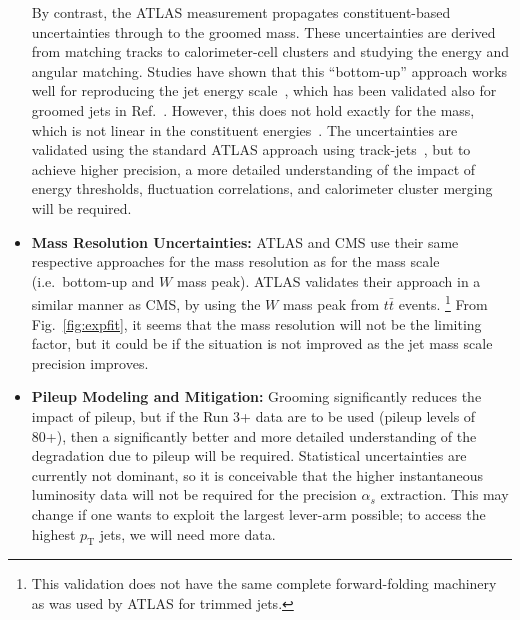 \documentclass[11pt,letterpaper]{article}
\DeclareRobustCommand{\Fig}[1]{Fig.~\ref{#1}}
\DeclareRobustCommand{\Ref}[1]{Ref.~\cite{#1}}
\begin{document}
\begin{itemize}
By contrast, the ATLAS measurement propagates constituent-based uncertainties through to the groomed mass.
%
These uncertainties are derived from matching tracks to calorimeter-cell clusters and studying the energy and angular matching.
%
Studies have shown that this ``bottom-up'' approach works well for reproducing the jet energy scale~\cite{Aaboud:2016hwh}, which has been validated also for groomed jets in \Ref{Aaboud:2017qwh}.
%
However, this does not hold exactly for the mass, which is not linear in the constituent energies~\cite{Nachman:2016qyc}.
%
The uncertainties are validated using the standard ATLAS approach using track-jets~\cite{Aad:2013gja,ATLAS-CONF-2017-063}, but to achieve higher precision, a more detailed understanding of the impact of energy thresholds, fluctuation correlations, and calorimeter cluster merging will be required.
%
\item {\bf Mass Resolution Uncertainties:} ATLAS and CMS use their same respective approaches for the mass resolution as for the mass scale (i.e.\ bottom-up and $W$ mass peak).
%
ATLAS validates their approach in a similar manner as CMS, by using the $W$ mass peak from $t\bar{t}$ events.%
\footnote{This validation does not have the same complete forward-folding machinery as was used by ATLAS for trimmed jets.}
%
From \Fig{fig:expfit}, it seems that the mass resolution will not be the limiting factor, but it could be if the situation is not improved as the jet mass scale precision improves.
%
\item {\bf Pileup Modeling and Mitigation:} Grooming significantly reduces the impact of pileup, but if the Run 3+ data are to be used (pileup levels of 80+), then a significantly better and more detailed understanding of the degradation due to pileup will be required.
%
Statistical uncertainties are currently not dominant, so it is conceivable that the higher instantaneous luminosity data will not be required for the precision $\alpha_s$ extraction.
%
This may change if one wants to exploit the largest lever-arm possible; to access the highest $p_\text{T}$ jets, we will need more data.
%
\end{itemize}
\end{document}
